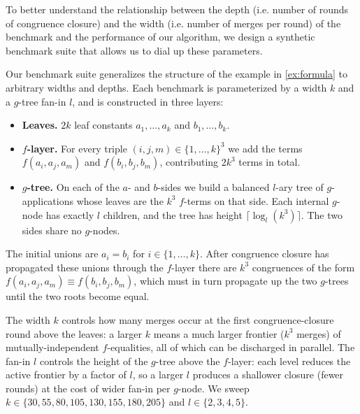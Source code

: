 To better understand the relationship between the depth (i.e. number of rounds
of congruence closure) and the width (i.e. number of merges per round) of the
benchmark and the performance of our algorithm, we design a synthetic benchmark
suite that allows us to dial up these parameters.

Our benchmark suite generalizes the structure of the example in
\autoref{ex:formula} to arbitrary widths and depths. Each benchmark is
parameterized by a width $k$ and a $g$-tree fan-in $l$, and is constructed
in three layers:

\begin{itemize}
  \item \textbf{Leaves.} $2k$ leaf constants $a_1, \ldots, a_k$ and $b_1,
        \ldots, b_k$.
  \item \textbf{$f$-layer.} For every triple $(i, j, m) \in \{1, \ldots,
        k\}^3$ we add the terms $f(a_i, a_j, a_m)$ and $f(b_i, b_j, b_m)$,
        contributing $2k^3$ terms in total.
  \item \textbf{$g$-tree.} On each of the $a$- and $b$-sides we build a
        balanced $l$-ary tree of $g$-applications whose leaves are the $k^3$
        $f$-terms on that side. Each internal $g$-node has exactly $l$
        children, and the tree has height $\lceil \log_l(k^3) \rceil$. The
        two sides share no $g$-nodes.
\end{itemize}

The initial unions are $a_i = b_i$ for $i \in \{1, \ldots, k\}$. After
congruence closure has propagated these unions through the $f$-layer there are
$k^3$ congruences of the form $f(a_i, a_j, a_m) \equiv f(b_i, b_j, b_m)$, which
must in turn propagate up the two $g$-trees until the two roots become equal.

The width $k$ controls how many merges occur at the first congruence-closure
round above the leaves: a larger $k$ means a much larger frontier ($k^3$
merges) of mutually-independent $f$-equalities, all of which can be discharged
in parallel. The fan-in $l$ controls the height of the $g$-tree above the
$f$-layer: each level reduces the active frontier by a factor of $l$, so a
larger $l$ produces a shallower closure (fewer rounds) at the cost of wider
fan-in per $g$-node. We sweep $k \in \{30, 55, 80, 105, 130, 155, 180, 205\}$
and $l \in \{2, 3, 4, 5\}$.

